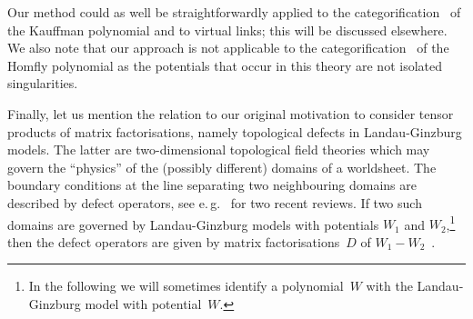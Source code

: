 \documentclass{compositio}
\theoremstyle{definition}
\numberwithin{equation}{section}
\begin{document}
Our method could as well be straightforwardly applied to the categorification~\cite{kr0701333} of the Kauffman polynomial and to virtual links; this will be discussed elsewhere. We also note that our approach is not applicable to the categorification~\cite{kr0505056} of the Homfly polynomial as the potentials that occur in this theory are not isolated singularities. 

\medskip

Finally, let us mention the relation to our original motivation to consider tensor products of matrix factorisations, namely topological defects in Landau-Ginzburg models. The latter are two-dimensional topological field theories which may govern the ``physics'' of the (possibly different) domains of a worldsheet.  The boundary conditions at the line separating two neighbouring domains are described by defect operators, see e.\,g.~\cite{k1004.2307, dkr1107.0495} for two recent reviews. If two such domains are governed by Landau-Ginzburg models with potentials $W_{1}$ and $W_{2}$,\footnote{In the following we will sometimes identify a polynomial~$W$ with the Landau-Ginzburg model with potential~$W$.} then the defect operators are given by matrix factorisations~$D$ of $W_{1}-W_{2}$~\cite{br0707.0922}. 
\end{document}
